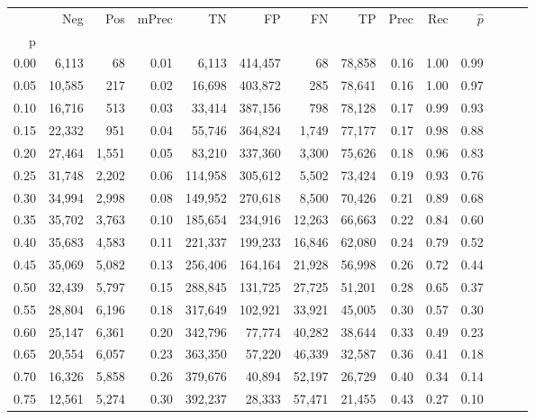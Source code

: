 \begin{tabular}{rrrrrrrrrrrrrr}
\toprule
{} &     Neg &    Pos & mPrec &       TN &       FP &      FN &      TP &  Prec &   Rec & $\hat{p}$ \\
p    &         &        &       &          &          &         &         &       &       &           \\
\midrule
0.00 &   6,113 &     68 &  0.01 &    6,113 &  414,457 &      68 &  78,858 &  0.16 &  1.00 &      0.99 \\
0.05 &  10,585 &    217 &  0.02 &   16,698 &  403,872 &     285 &  78,641 &  0.16 &  1.00 &      0.97 \\
0.10 &  16,716 &    513 &  0.03 &   33,414 &  387,156 &     798 &  78,128 &  0.17 &  0.99 &      0.93 \\
0.15 &  22,332 &    951 &  0.04 &   55,746 &  364,824 &   1,749 &  77,177 &  0.17 &  0.98 &      0.88 \\
0.20 &  27,464 &  1,551 &  0.05 &   83,210 &  337,360 &   3,300 &  75,626 &  0.18 &  0.96 &      0.83 \\
0.25 &  31,748 &  2,202 &  0.06 &  114,958 &  305,612 &   5,502 &  73,424 &  0.19 &  0.93 &      0.76 \\
0.30 &  34,994 &  2,998 &  0.08 &  149,952 &  270,618 &   8,500 &  70,426 &  0.21 &  0.89 &      0.68 \\
0.35 &  35,702 &  3,763 &  0.10 &  185,654 &  234,916 &  12,263 &  66,663 &  0.22 &  0.84 &      0.60 \\
0.40 &  35,683 &  4,583 &  0.11 &  221,337 &  199,233 &  16,846 &  62,080 &  0.24 &  0.79 &      0.52 \\
0.45 &  35,069 &  5,082 &  0.13 &  256,406 &  164,164 &  21,928 &  56,998 &  0.26 &  0.72 &      0.44 \\
0.50 &  32,439 &  5,797 &  0.15 &  288,845 &  131,725 &  27,725 &  51,201 &  0.28 &  0.65 &      0.37 \\
0.55 &  28,804 &  6,196 &  0.18 &  317,649 &  102,921 &  33,921 &  45,005 &  0.30 &  0.57 &      0.30 \\
0.60 &  25,147 &  6,361 &  0.20 &  342,796 &   77,774 &  40,282 &  38,644 &  0.33 &  0.49 &      0.23 \\
0.65 &  20,554 &  6,057 &  0.23 &  363,350 &   57,220 &  46,339 &  32,587 &  0.36 &  0.41 &      0.18 \\
0.70 &  16,326 &  5,858 &  0.26 &  379,676 &   40,894 &  52,197 &  26,729 &  0.40 &  0.34 &      0.14 \\
0.75 &  12,561 &  5,274 &  0.30 &  392,237 &   28,333 &  57,471 &  21,455 &  0.43 &  0.27 &      0.10 \\

\end{tabular}
